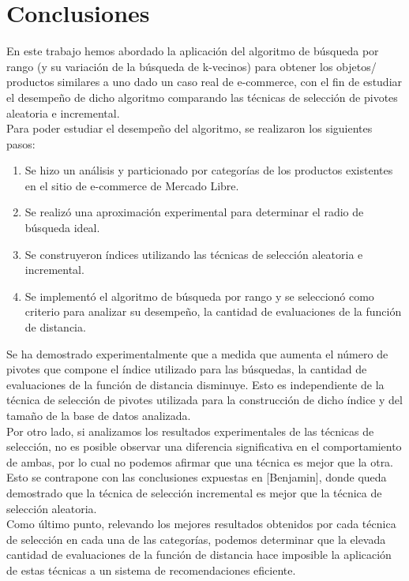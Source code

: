 \chapter{Conclusiones}

En este trabajo hemos abordado la aplicaci\'on del algoritmo de b\'usqueda por rango (y su variaci\'on de la b\'usqueda de k-vecinos) para obtener los objetos/ productos similares a uno dado un caso real de e-commerce, con el fin de estudiar el desempeño de dicho algoritmo comparando las t\'ecnicas de selecci\'on de pivotes aleatoria e incremental.\\

Para poder estudiar el desempeño del algoritmo, se realizaron los siguientes pasos:

\begin{enumerate}
\item Se hizo un an\'alisis y particionado por categor\'ias de los productos existentes en el sitio de e-commerce de Mercado Libre.
\item Se realiz\'o una aproximaci\'on experimental para determinar el radio de b\'usqueda ideal.
\item Se construyeron \'indices utilizando las t\'ecnicas de selecci\'on aleatoria e incremental.
\item Se implement\'o el algoritmo de b\'usqueda por rango y  se seleccion\'o como criterio para analizar su desempeño, la cantidad de evaluaciones de la funci\'on de distancia.
\end{enumerate}

Se ha demostrado experimentalmente que a medida que aumenta el n\'umero de pivotes que compone el \'indice utilizado para las b\'usquedas, la cantidad de evaluaciones de la funci\'on de distancia disminuye. Esto es independiente de la t\'ecnica de selecci\'on de pivotes utilizada para la construcci\'on de dicho \'indice y del tamaño de la base de datos analizada.\\

Por otro lado, si analizamos los resultados experimentales de las t\'ecnicas de selecci\'on, no es posible observar una diferencia significativa en el comportamiento de ambas, por lo cual no podemos afirmar que una t\'ecnica es mejor que la otra. Esto se contrapone con las conclusiones expuestas en [Benjamin], donde queda demostrado que la t\'ecnica de selecci\'on incremental es mejor que la t\'ecnica de selecci\'on aleatoria.\\

Como \'ultimo punto, relevando los mejores resultados obtenidos por cada t\'ecnica de selecci\'on en cada una de las categor\'ias, podemos determinar que la elevada cantidad de evaluaciones de la funci\'on de distancia hace imposible la aplicaci\'on de estas t\'ecnicas a un sistema de recomendaciones eficiente.\\

